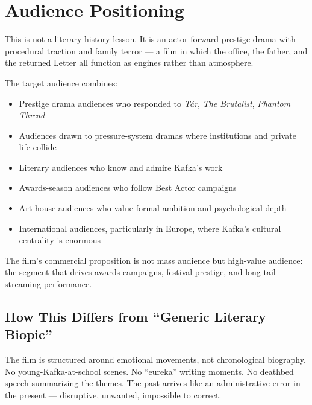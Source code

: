 

\section{Audience Positioning}

This is not a literary history lesson. It is an actor-forward prestige drama with procedural traction and family terror --- a film in which the office, the father, and the returned Letter all function as engines rather than atmosphere.

The target audience combines:

\begin{itemize}[leftmargin=*]
\item Prestige drama audiences who responded to \textit{Tár}, \textit{The Brutalist}, \textit{Phantom Thread}
\item Audiences drawn to pressure-system dramas where institutions and private life collide
\item Literary audiences who know and admire Kafka's work
\item Awards-season audiences who follow Best Actor campaigns
\item Art-house audiences who value formal ambition and psychological depth
\item International audiences, particularly in Europe, where Kafka's cultural centrality is enormous
\end{itemize}

The film's commercial proposition is not mass audience but high-value audience: the segment that drives awards campaigns, festival prestige, and long-tail streaming performance.

\subsection{How This Differs from ``Generic Literary Biopic''}

The film is structured around emotional movements, not chronological biography. No young-Kafka-at-school scenes. No ``eureka'' writing moments. No deathbed speech summarizing the themes. The past arrives like an administrative error in the present --- disruptive, unwanted, impossible to correct.

